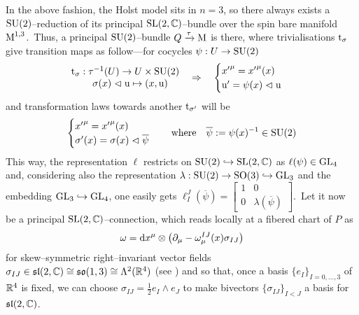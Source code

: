 In the above fashion, the Holst model sits in $n=3$, so there always exists a $\text{\normalfont SU}(2)$--reduction of its principal $\text{\normalfont SL}(2,\mathbb{C})$--bundle over the spin bare manifold $\text{\normalfont M}^{1,3}$.\, Thus, a principal $\text{\normalfont SU}(2)$--bundle $Q\xrightarrow{\tau}\text{\normalfont M}$ is there, where trivialisations $\text{\normalfont t}_\sigma$ give transition maps as follow---for cocycles $\psi:U\to\text{\normalfont SU}(2)$ 
$$\begin{matrix}
    \text{\normalfont t}_\sigma:\tau^{-1}(U)\to U\times\text{\normalfont SU}(2)\\
    \quad\sigma(x)\vartriangleleft\text{\normalfont u}\mapsto(x,\text{\normalfont u})
\end{matrix}\quad\Rightarrow\quad\begin{matrix}
    \begin{cases}
    {x'}^\mu={x'}^\mu(x)\\
    \text{\normalfont u}'=\psi(x)\vartriangleleft\text{\normalfont u}
\end{cases}
\end{matrix}$$
and transformation laws towards another $\text{\normalfont t}_{\sigma'}$ will be
$$\begin{cases}
    {x'}^\mu={x'}^\mu(x)\\
    \sigma'(x)=\sigma(x)\vartriangleleft\overline{\psi}
\end{cases}\quad\text{where}\quad\overline{\psi}:=\psi(x)^{-1}\in\text{\normalfont SU}(2)$$
This way, the representation $\ell$ restricts on $\text{\normalfont SU}(2)\hookrightarrow\text{\normalfont SL}(2,\mathbb{C})$ as $\ell(\psi)\in\text{\normalfont GL}_4$ and, considering also the representation $\lambda:\text{\normalfont SU}(2)\to\text{\normalfont SO}(3)\hookrightarrow\text{\normalfont GL}_3$ and the embedding $\text{\normalfont GL}_3\hookrightarrow\text{\normalfont GL}_4$, one easily gets $\ell^J_I(\overline{\psi})=\begin{bmatrix}
    1&0\\
    0&\lambda(\overline{\psi})
\end{bmatrix}$.\, Let it now be a principal $\text{\normalfont SL}(2,\mathbb{C})$--connection, which reads locally at a fibered chart of $P$ as
$$\omega=\d x^\mu\otimes\left(\der_\mu-\omega^{IJ}_\mu(x)\sigma_{IJ}\right)%
$$
for skew--symmetric right--invariant vector fields $\sigma_{IJ}\in\mathfrak{sl}(2,\mathbb{C})\cong\mathfrak{so}(1,3)\cong\Lambda^2(\mathbb{R}^4)$ (see \cite{spin}) and so that, once a basis $\{e_I\}_{I=0,\hdots,3}$ of $\mathbb{R}^4$ is fixed, we can choose $\sigma_{IJ}=\frac{1}{2}e_I\wedge e_J$ to make bivectors $\{\sigma_{IJ}\}_{I<J}$ a basis for $\mathfrak{sl}(2,\mathbb{C})$. 

